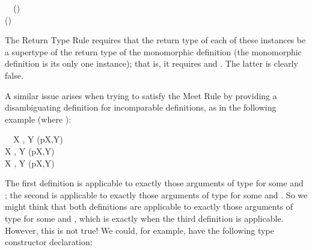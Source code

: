 \documentclass[10pt]{sigplanconf}
\newcommand{\TODO}[1]{\textbf{\emph{\textcolor{red}{TODO}}}: \textsf{\footnotesize #1}}
\begin{document}
\small
\begin{FortressCode}
{\tt ~~}\+\bigl(\llbracket{}\rrbracket\bigr)\COLON {}\llbracket{}\rrbracket \\
  \bigl(\llbracket{}\rrbracket\bigr)\COLON {}\llbracket{}\rrbracket\-
\end{FortressCode}
\normalsize
The Return Type Rule requires that 
the return type of each of these instances 
be a supertype of the return type of the monomorphic definition
(the monomorphic definition is its only one instance); 
that is, it requires 
and .
The latter is clearly false.

A similar issue arises 
when trying to satisfy the Meet Rule 
by providing a disambiguating definition 
for incomparable definitions, 
as in the following example 
(where ):

\small
\begin{FortressCode}
{\tt ~~}\+\llbracket{}X \SHORTCUT{<} , Y \SHORTCUT{<} \rrbracket\bigl(p\COLON {}\llbracket{}X,Y\rrbracket\bigr)\COLON {} \\
  \llbracket{}X \SHORTCUT{<} , Y \SHORTCUT{<} \rrbracket\bigl(p\COLON {}\llbracket{}X,Y\rrbracket\bigr)\COLON {} \\
  \llbracket{}X \SHORTCUT{<} , Y \SHORTCUT{<} \rrbracket\bigl(p\COLON {}\llbracket{}X,Y\rrbracket\bigr)\COLON {}\-
\end{FortressCode}
\normalsize
The first definition is applicable to exactly those arguments 
of type  for some  and ;
the second is applicable to exactly those arguments
of type  for some  and .
So we might think that both definitions are applicable 
to exactly those arguments of type  for some  and , 
which is exactly when the third definition is applicable.
However, 
this is not true!
We could, for example, have the following type constructor declaration:
\end{document}
